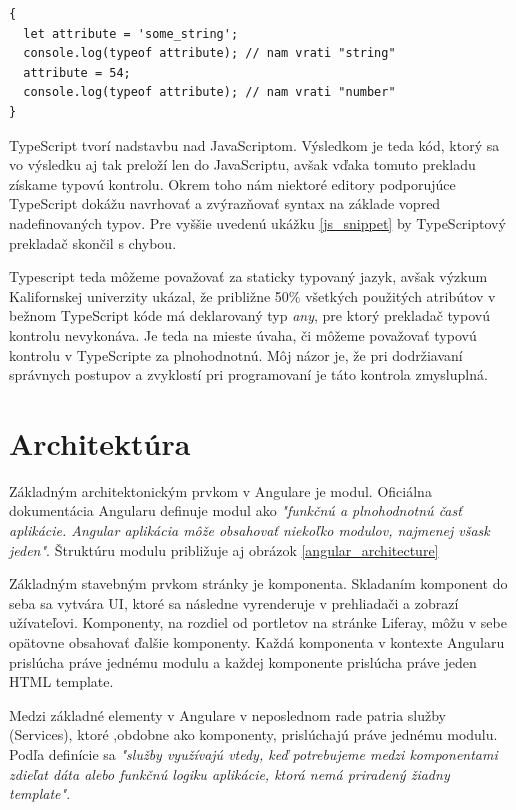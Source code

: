 \documentclass[
  digital, %
  twoside, %
  notable,   %
  nolof,   %
  nolot,   %
]{fithesis3}
\begin{document}
\begin{lstlisting}[caption={Kód v JavaScripte},captionpos=b,label=js_snippet]
{
  let attribute = 'some_string';
  console.log(typeof attribute); // nam vrati "string"
  attribute = 54;
  console.log(typeof attribute); // nam vrati "number"
}
\end{lstlisting}

TypeScript tvorí nadstavbu nad JavaScriptom. Výsledkom je teda kód, ktorý sa vo výsledku aj tak preloží len do JavaScriptu, avšak vďaka tomuto prekladu získame typovú kontrolu. Okrem toho nám niektoré editory podporujúce TypeScript dokážu navrhovať a zvýrazňovať syntax na základe vopred nadefinovaných typov. Pre vyššie uvedenú ukážku \ref{js_snippet} by TypeScriptový prekladač skončil s chybou.

Typescript teda môžeme považovať za staticky typovaný jazyk, avšak výzkum Kalifornskej univerzity\cite{ray2014large} ukázal, že približne 50\% všetkých použitých atribútov v bežnom TypeScript kóde má deklarovaný typ \textit{any}, pre ktorý prekladač typovú kontrolu nevykonáva. Je teda na mieste úvaha, či môžeme považovať typovú kontrolu v TypeScripte za plnohodnotnú. Môj názor je, že pri dodržiavaní správnych postupov a zvyklostí pri programovaní je táto kontrola zmysluplná.

\section{Architektúra}
Základným architektonickým prvkom v Angulare je modul. Oficiálna dokumentácia Angularu definuje modul ako \textit{"funkčnú a plnohodnotnú časť aplikácie. Angular aplikácia môže obsahovať niekoľko modulov, najmenej všask jeden"}\cite{angular}. Štruktúru modulu približuje aj obrázok \ref{angular_architecture}

Základným stavebným prvkom stránky je komponenta. Skladaním komponent do seba sa vytvára UI, ktoré sa následne vyrenderuje v prehliadači a zobrazí užívateľovi. Komponenty, na rozdiel od portletov na stránke Liferay, môžu v sebe opätovne obsahovať ďalšie komponenty. Každá komponenta v kontexte Angularu prislúcha práve jednému modulu a každej komponente prislúcha práve jeden HTML template.

Medzi základné elementy v Angulare v neposlednom rade patria služby (Services), ktoré ,obdobne ako komponenty, prislúchajú práve jednému modulu. Podľa definície sa \textit{"služby využívajú vtedy, keď potrebujeme medzi komponentami zdieľat dáta alebo funkčnú logiku aplikácie, ktorá nemá priradený žiadny template"}\cite{angular}.
\end{document}
